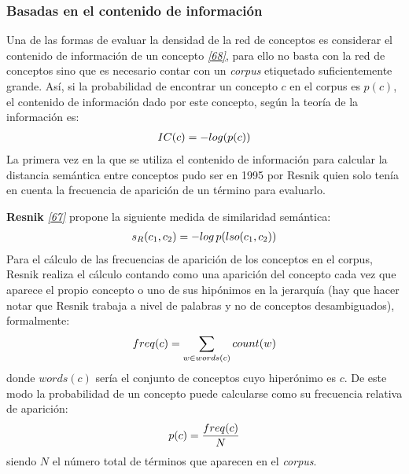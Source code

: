 \documentclass[a4paper,12pt,spanish]{book}
\begin{document}
\subsubsection{Basadas en el contenido de información}
\label{1.state-of-the-art/ii.medidas-distancia:basadas-en-el-contenido-de-informacion}\label{1.state-of-the-art/ii.medidas-distancia:redes-conceptos-contenido-informacion}
Una de las formas de evaluar la densidad de la red de conceptos es considerar el contenido de
información de un concepto \label{1.state-of-the-art/ii.medidas-distancia:id43}{\hyperref[zreferences:resnik1999]{\emph{{[}68{]}}}}, para ello no basta con la red de conceptos
sino que es necesario contar con un \emph{corpus} etiquetado suficientemente grande. Así,
si la probabilidad de encontrar un concepto \(c\) en el corpus es \(p(c)\),
el contenido de información dado por este concepto, según la teoría de la información es:
\begin{gather}
\begin{split}IC(c) = -log(p(c))\end{split}\notag
\end{gather}
La primera vez en la que se utiliza el contenido de información para calcular la distancia
semántica entre conceptos pudo ser en 1995 por Resnik quien solo tenía
en cuenta la frecuencia de aparición de un término para evaluarlo.

\textbf{Resnik} \label{1.state-of-the-art/ii.medidas-distancia:id44}{\hyperref[zreferences:resnik1995]{\emph{{[}67{]}}}} propone la siguiente medida de similaridad semántica:
\begin{gather}
\begin{split}s_R(c_1, c_2) = -log \, p(lso(c_1, c_2))\end{split}\notag
\end{gather}
Para el cálculo de las frecuencias de aparición de los conceptos en el corpus, Resnik realiza
el cálculo contando como una aparición del concepto cada vez que aparece el propio concepto
o uno de sus hipónimos en la jerarquía (hay que hacer notar que Resnik trabaja a nivel de palabras
y no de conceptos desambiguados), formalmente:
\begin{gather}
\begin{split}freq(c) = \sum_{w \in words(c)} count(w)\end{split}\notag
\end{gather}
donde \(words(c)\) sería el conjunto de conceptos cuyo hiperónimo es \(c\). De este modo
la probabilidad de un concepto puede calcularse como su frecuencia relativa de aparición:
\begin{gather}
\begin{split}p(c) = \frac{freq(c)}{N}\end{split}\notag
\end{gather}
siendo \(N\) el número total de términos que aparecen en el \emph{corpus}.
\end{document}
